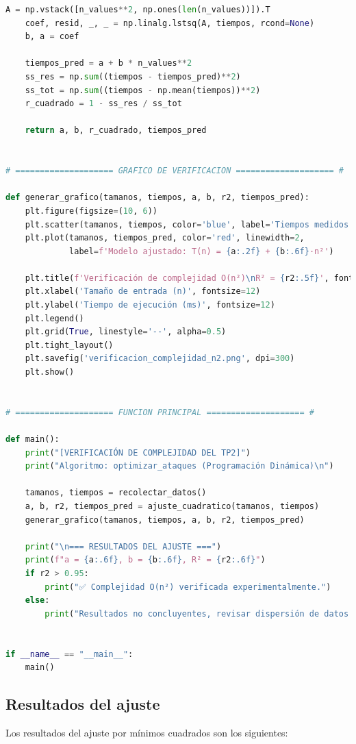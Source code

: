 \begin{lstlisting}[language=Python, caption=Código de ajuste por mínimos cuadrados para TP2]
    A = np.vstack([n_values**2, np.ones(len(n_values))]).T
    coef, resid, _, _ = np.linalg.lstsq(A, tiempos, rcond=None)
    b, a = coef

    tiempos_pred = a + b * n_values**2
    ss_res = np.sum((tiempos - tiempos_pred)**2)
    ss_tot = np.sum((tiempos - np.mean(tiempos))**2)
    r_cuadrado = 1 - ss_res / ss_tot

    return a, b, r_cuadrado, tiempos_pred


# ==================== GRAFICO DE VERIFICACION ==================== #

def generar_grafico(tamanos, tiempos, a, b, r2, tiempos_pred):
    plt.figure(figsize=(10, 6))
    plt.scatter(tamanos, tiempos, color='blue', label='Tiempos medidos', s=80)
    plt.plot(tamanos, tiempos_pred, color='red', linewidth=2,
             label=f'Modelo ajustado: T(n) = {a:.2f} + {b:.6f}·n²')

    plt.title(f'Verificación de complejidad O(n²)\nR² = {r2:.5f}', fontsize=14, fontweight='bold')
    plt.xlabel('Tamaño de entrada (n)', fontsize=12)
    plt.ylabel('Tiempo de ejecución (ms)', fontsize=12)
    plt.legend()
    plt.grid(True, linestyle='--', alpha=0.5)
    plt.tight_layout()
    plt.savefig('verificacion_complejidad_n2.png', dpi=300)
    plt.show()


# ==================== FUNCION PRINCIPAL ==================== #

def main():
    print("[VERIFICACIÓN DE COMPLEJIDAD DEL TP2]")
    print("Algoritmo: optimizar_ataques (Programación Dinámica)\n")

    tamanos, tiempos = recolectar_datos()
    a, b, r2, tiempos_pred = ajuste_cuadratico(tamanos, tiempos)
    generar_grafico(tamanos, tiempos, a, b, r2, tiempos_pred)

    print("\n=== RESULTADOS DEL AJUSTE ===")
    print(f"a = {a:.6f}, b = {b:.6f}, R² = {r2:.6f}")
    if r2 > 0.95:
        print("✅ Complejidad O(n²) verificada experimentalmente.")
    else:
        print("Resultados no concluyentes, revisar dispersión de datos.")


if __name__ == "__main__":
    main()

\end{lstlisting}

\subsection{Resultados del ajuste}

Los resultados del ajuste por mínimos cuadrados son los siguientes:

